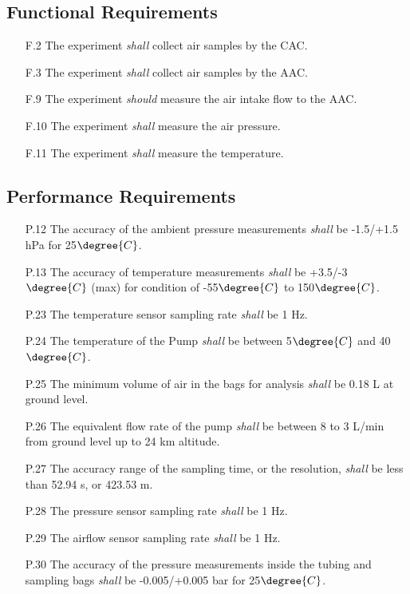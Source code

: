 \documentclass[a4paper,12pt,oneside]{article}
\begin{document}
\subsection{Functional Requirements}

\begin{enumerate}
    \item[F.2] The experiment \textit{shall} collect air samples by the CAC.
    \item[F.3] The experiment \textit{shall} collect air samples by the AAC.
    \item[F.9] The experiment \textit{should} measure the air intake flow to the AAC.
    \item[F.10] The experiment \textit{shall} measure the air pressure.
    \item[F.11] The experiment \textit{shall} measure the temperature.
\end{enumerate}
\subsection{Performance Requirements}

\begin{enumerate}
    \item[P.12] The accuracy of the ambient pressure measurements \textit{shall} be -1.5/+1.5 hPa for 25$\degree{C}$.
    \item[P.13] The accuracy of temperature measurements \textit{shall} be +3.5/-3$\degree{C}$ (max) for condition of -55$\degree{C}$ to 150$\degree{C}$.
    \item[P.23] The temperature sensor sampling rate \textit{shall} be 1 Hz.\label{newsamplerate}
    \item[P.24] The temperature of the Pump \textit{shall} be between 5$\degree{C}$ and 40$\degree{C}$. 
    \item[P.25] The minimum volume of air in the bags for analysis \textit{shall} be 0.18 L at ground level.
    \item[P.26] The equivalent flow rate of the pump \textit{shall} be between 8 to 3 L/min from ground level up to 24 km altitude.
    \item[P.27] The accuracy range of the sampling time, or the resolution, \textit{shall} be less than 52.94 s, or 423.53 m.
    \item[P.28] The pressure sensor sampling rate \textit{shall} be 1 Hz.\label{newsamplerate}
    \item[P.29] The airflow sensor sampling rate \textit{shall} be 1 Hz.\label{newsamplerate}
    \item[P.30] The accuracy of the pressure measurements inside the tubing and sampling bags \textit{shall} be -0.005/+0.005 bar for 25$\degree{C}$.

 \end{enumerate} 
\pagebreak
\end{document}
